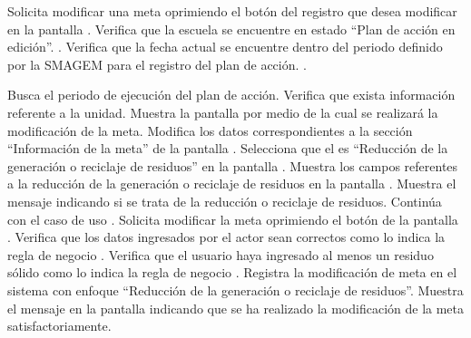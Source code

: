  
\begin{UCtrayectoria}
	\UCpaso[\UCactor] Solicita modificar una meta oprimiendo el botón \botEdit del registro que desea modificar en la pantalla . 
	\UCpaso[\UCsist] Verifica que la escuela se encuentre en  estado ``Plan de acción en edición''. .
    \UCpaso[\UCsist] Verifica que la fecha actual se encuentre dentro del periodo definido por la SMAGEM para el registro del plan de acción. .
	
	\UCpaso[\UCsist] Busca el periodo de ejecución del plan de acción.
	\UCpaso[\UCsist] Verifica que exista información referente a la unidad. 
	\UCpaso[\UCsist] Muestra la pantalla  por medio de la cual se realizará la modificación de la meta.
	\UCpaso[\UCactor] Modifica los datos correspondientes a la sección ``Información de la meta'' de la pantalla . \label{cuprs2:ingresaDatos}
	\UCpaso[\UCactor] Selecciona que el  es ``Reducción de la generación o reciclaje de residuos'' en la pantalla . 
	\UCpaso[\UCsist] Muestra los campos referentes a la reducción de la generación o reciclaje de residuos en la pantalla .
	\UCpaso[\UCsist] Muestra el mensaje  indicando si se trata de la reducción o reciclaje de residuos.
	\UCpaso[\UCactor] Continúa con el caso de uso .
	\UCpaso[\UCactor] Solicita modificar la meta oprimiendo el botón  de la pantalla . 
	\UCpaso[\UCsist] Verifica que los datos ingresados por el actor sean correctos como lo indica la regla de negocio .   
	\UCpaso[\UCsist] Verifica que el usuario haya ingresado al menos un residuo sólido como lo indica la regla de negocio . 
	\UCpaso[\UCsist] Registra la modificación de meta en el sistema con enfoque ``Reducción de la generación o reciclaje de residuos''.
	\UCpaso[\UCsist] Muestra el mensaje  en la pantalla  indicando que se ha realizado la modificación de la meta satisfactoriamente. \label{cuprs2:muestraMensaje}
\end{UCtrayectoria}



